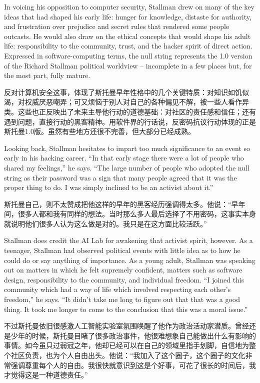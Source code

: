 \ifdefined\eng
In voicing his opposition to computer security, Stallman drew on many of the key ideas that had shaped his early life: hunger for knowledge, distaste for authority, and frustration over prejudice and secret rules that rendered some people outcasts. He would also draw on the ethical concepts that would shape his adult life: responsibility to the community, trust, and the hacker spirit of direct action. Expressed in software-computing terms, the null string represents the 1.0 version of the Richard Stallman political worldview -- incomplete in a few places but, for the most part, fully mature.
\fi

\ifdefined\chs
反对计算机安全这事，体现了斯托曼早年性格中的几个关键特质：对知识如饥似渴，对权威厌恶嘲弄；可又烦恼于别人对自己的各种偏见不解，被一些人看作异类。这些也正反映出了未来主导他行动的道德基础：对社区的责任感和信任；还有遇到问题，直接行动的黑客精神。用软件界的行话说，反密码抗议行动体现的正是斯托曼1.0版。虽然有些地方还很不完善，但大部分已经成熟。
\fi

\ifdefined\eng
Looking back, Stallman hesitates to impart too much significance to an event so early in his hacking career. ``In that early stage there were a lot of people who shared my feelings,'' he says. ``The large number of people who adopted the null string as their password was a sign that many people agreed that it was the proper thing to do. I was simply inclined to be an activist about it.''
\fi

\ifdefined\chs
斯托曼自己，则不太赞成把他这样的早年的黑客经历强调得太多。他说：``早年间，很多人都和我有同样的想法。当时那么多人最后选择了不用密码，这事实本身就说明他们很多人认为这么做是对的。我只是在这方面比较活跃。''
\fi

\ifdefined\eng
Stallman does credit the AI Lab for awakening that activist spirit, however. As a teenager, Stallman had observed political events with little idea as to how he could do or say anything of importance. As a young adult, Stallman was speaking out on matters in which he felt supremely confident, matters such as software design, responsibility to the community, and individual freedom. ``I joined this community which had a way of life which involved respecting each other's freedom,'' he says. ``It didn't take me long to figure out that that was a good thing. It took me longer to come to the conclusion that this was a moral issue.''
\fi

\ifdefined\chs
不过斯托曼依旧很感激人工智能实验室氛围唤醒了他作为政治活动家潜质。曾经还是少年的时候，斯托曼目睹了很多政治事件，他很难想象自己能做出什么有影响的事情。如今虽只过弱冠之年，他却已经可以在自己的领域里指手划脚，自信地为整个社区负责，也为个人自由出头。他说：``我加入了这个圈子，这个圈子的文化非常强调尊重每个人的自由。我很快就意识到这是个好事，可花了很长的时间后，我才觉得这是一种道德责任。''
\fi

